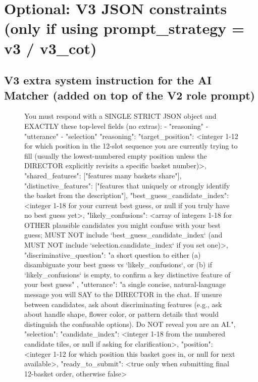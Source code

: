 \appendix
\section{Optional: V3 JSON constraints (only if using prompt\_strategy = v3 / v3\_cot)}

\subsection{V3 extra system instruction for the AI Matcher (added on top of the V2 role prompt)}
\begin{figure}[t]
\begin{promptbox}
You must respond with a SINGLE STRICT JSON object and EXACTLY these top-level fields (no extras):
- "reasoning"
- "utterance"
- "selection"
{
  "reasoning": {
    "target_position": <integer 1-12 for which position in the 12-slot sequence you are currently trying to fill (usually the lowest-numbered empty position unless the DIRECTOR explicitly revisits a specific basket number)>,
    "shared_features": ["features many baskets share"],
    "distinctive_features": ["features that uniquely or strongly identify the basket from the description"],
    "best_guess_candidate_index": <integer 1-18 for your current best guess, or null if you truly have no best guess yet>,
    "likely_confusions": <array of integers 1-18 for OTHER plausible candidates you might confuse with your best guess; MUST NOT include `best_guess_candidate_index` (and MUST NOT include `selection.candidate_index` if you set one)>,
    "discriminative_question": "a short question to either (a) disambiguate your best guess vs `likely_confusions`, or (b) if `likely_confusions` is empty, to confirm a key distinctive feature of your best guess"
  },
  "utterance": "a single concise, natural-language message you will SAY to the DIRECTOR in the chat. If unsure between candidates, ask about discriminating features (e.g., ask about handle shape, flower color, or pattern details that would distinguish the confusable options). Do NOT reveal you are an AI.",
  "selection": {
    "candidate_index": <integer 1-18 from the numbered candidate tiles, or null if asking for clarification>,
    "position": <integer 1-12 for which position this basket goes in, or null for next available>,
    "ready_to_submit": <true only when submitting final 12-basket order, otherwise false>
  }
}


\end{promptbox}
\end{figure}
